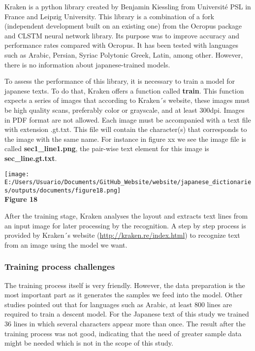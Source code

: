 \documentclass[
]{article}
\begin{document}
Kraken is a python library created by Benjamin Kiessling from Université
PSL in France and Leipzig University. This library is a combination of a
fork (independent development built on an existing one) from the Ocropus
package and CLSTM neural network library. Its purpose was to improve
accuracy and performance rates compared with Ocropus. It has been tested
with languages such as Arabic, Persian, Syriac Polytonic Greek, Latin,
among other. However, there is no information about japanese-trained
models.

To assess the performance of this library, it is necessary to train a
model for japanese texts. To do that, Kraken offers a function called
\textbf{train}. This function expects a series of images that according
to Kraken´s website, these images must be high quality scans, preferably
color or grayscale, and at least 300dpi. Images in PDF format are not
allowed. Each image must be accompanied with a text file with extension
.gt.txt. This file will contain the character(s) that corresponds to the
image with the same name. For instance in figure xx we see the image
file is called \textbf{sec1\_line1.png}, the pair-wise text element for
this image is \textbf{sec\_line.gt.txt}.

\texttt{[image: E:/Users/Usuario/Documents/GitHub\_Website/website/japanese\_dictionaries/outputs/documents/figure18.png]}\\
\textbf{Figure 18}

After the training stage, Kraken analyses the layout and extracts text
lines from an input image for later processing by the recognition. A
step by step process is provided by Kraken´s website
(\url{http://kraken.re/index.html}) to recognize text from an image
using the model we want.

\hypertarget{training-process-challenges}{%
\subsubsection{Training process
challenges}\label{training-process-challenges}}

The training process itself is very friendly. However, the data
preparation is the most important part as it generates the samples we
feed into the model. Other studies pointed out that for languages such
as Arabic, at least 800 lines are required to train a descent model. For
the Japanese text of this study we trained 36 lines in which several
characters appear more than once. The result after the training process
was not good, indicating that the need of greater sample data might be
needed which is not in the scope of this study.
\end{document}
